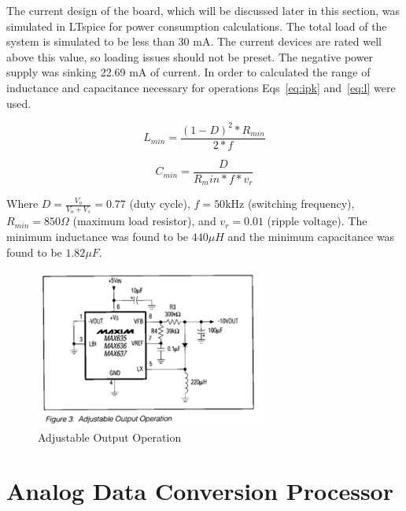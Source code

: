 \documentclass[12pt,journal]{IEEEtran}
\begin{document}
The current design of the board, which will be discussed later in this section, was simulated in LTspice for power consumption calculations. The total load of the system is simulated to be less than 30 mA. The current devices are rated well above this value, so loading issues should not be preset. The negative power supply was sinking 22.69 mA of current. In order to calculated the range of inductance and capacitance necessary for operations Eqs~\ref{eq:ipk} and~\ref{eq:l} were used. 

\begin{equation}
L_{min} = \frac{(1-D)^2 * R_{min}}{2*f}
\label{eq:ipk}
\end{equation}

\begin{equation}
C_{min} = \frac{D}{R_min*f*v_r}
\label{eq:l}
\end{equation}

Where $D = \frac{V_o}{V_o + V_s} = 0.77$ (duty cycle), $f = 50\text{kHz}$ (switching frequency), $R_{min} = 850\Omega$ (maximum load resistor), and $v_r = 0.01$ (ripple voltage). The minimum inductance was found to be $440\mu H$ and the minimum capacitance was found to be $1.82\mu F$. 

\begin{figure}
	\centering
	\includegraphics[width=3in]{./max635.png}
	\caption{Adjustable Output Operation~\cite{MAX635}}
	\label{fig:max635}
\end{figure}



\section{Analog Data Conversion Processor}\label{processor}
\end{document}
